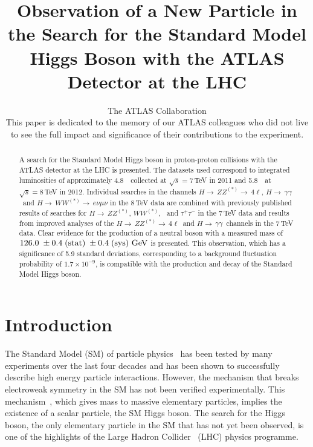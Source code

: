 \documentclass[final,3p,times,twocolumn]{elsarticle}
\newcommand{\hgg}{\ensuremath{H{\rightarrow\,}\gamma\gamma}}
\newcommand{\hWWenmun}{\ensuremath{H{\rightarrow\,}WW^{(*)}{\rightarrow\,}e\nu\mu\nu}}
\newcommand\htollll{$H{\rightarrow\,}ZZ^{(*)}{\rightarrow\,}4\ell$}
\newcommand{\masspeak}{126.0}
\newcommand{\massresultStatSys}{\mbox{\ensuremath{\masspeak \; \pm 0.4 \;\textrm{(stat)} \; \pm 0.4\; \textrm{(sys)}~\mathrm{GeV}}}}
\newcommand{\papertitle}{Observation of a New Particle in the Search for
  the Standard Model Higgs Boson with the ATLAS Detector at the LHC}
\begin{document}
\begin{frontmatter}

\title{\papertitle}

\author{The ATLAS Collaboration\\ \vspace{1cm} This paper is dedicated to the memory of our ATLAS 
colleagues who did not live to see the full impact and significance of their
contributions to the experiment. \vspace{-0.75cm}
}

\begin{abstract}

  A 
  search for the Standard Model Higgs boson in
  proton-proton collisions with the ATLAS detector at the LHC is
  presented.  The datasets used correspond to integrated luminosities
  of approximately 4.8~\ifb\ collected at $\sqrt{s}=7$\,TeV in 2011 and 5.8~\ifb\
  at $\sqrt{s}=8$\,TeV in 2012.  Individual searches in the channels
  \htollll, \hgg\ and $\hWWenmun$ in the
  8\,TeV data are combined with previously published results of
  searches for $H{\rightarrow\,}ZZ^{(*)}$, $WW^{(*)}$, \bbbar\ and
  $\tau^+\tau^-$ in the 7\,TeV data and results from improved analyses of the \htollll\ and
  \hgg\  channels in the 7\,TeV data.  Clear evidence
  for the production of a neutral boson with a measured mass of $\massresultStatSys$ 
  is presented. This observation, which has a significance of 5.9 standard deviations,
  corresponding to a background fluctuation probability of $1.7\times 10^{-9}$, 
  is compatible with the production and decay of the Standard Model Higgs boson. 

\end{abstract}

\end{frontmatter}



\section{Introduction}

The Standard Model (SM) of particle
physics~\cite{np_22_579,prl_19_1264,sm_salam,tHooft:1972fi} has been
tested by many experiments over the last four decades and has been
shown to successfully describe high energy particle
interactions. However, the mechanism that breaks electroweak symmetry
in the SM has not been verified experimentally.  This
mechanism~\cite{Englert:1964et,Higgs:1964ia,Higgs:1964pj,Guralnik:1964eu,Higgs:1966ev,Kibble:1967sv},
which gives mass to massive elementary particles, implies the
existence of a scalar particle, the SM Higgs boson.  The search for
the Higgs boson, the only elementary particle in the SM that has
not yet been observed, is one of the highlights of the Large Hadron
Collider~\cite{1748-0221-3-08-S08001} (LHC) physics programme.
\end{document}
